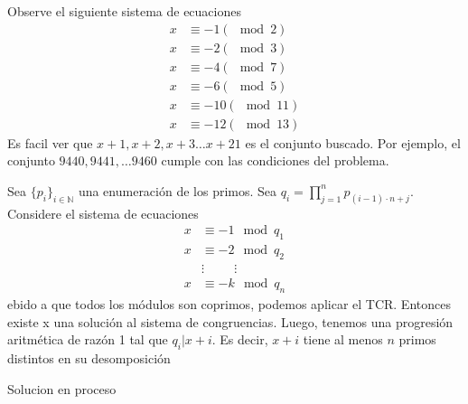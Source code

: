 \begin{sol}
	Observe el siguiente sistema de ecuaciones
	\begin{align}
	x & \equiv -1 (\mod 2) \\
	x & \equiv -2 (\mod 3) \\
	x & \equiv -4 (\mod 7) \\
	x & \equiv -6 (\mod 5) \\
	x & \equiv -10 (\mod 11) \\
	x & \equiv -12 ( \mod 13)
	\end{align}
	Es facil ver que $x+1, x+2, x+3 \dots x+21$ es el conjunto buscado.
	Por ejemplo, el conjunto ${9440, 9441, \dots 9460 }$ cumple con las condiciones del problema.
\end{sol}

\begin{sol}
	Sea $\{p_{i}\}_{i\in \mathbb{N}}$ una enumeraci\'on de los primos. Sea $q_{i} = \prod_{j=1}^{n} p_{(i-1)\cdot n + j }$. Considere el sistema de ecuaciones
	\begin{align}
	x &\equiv -1 \mod q_{1} \\
	x&\equiv -2 \mod q_{2} \\
	&\vdots \hspace{1cm} \vdots \\
	x &\equiv -k \mod q_{n}   
	\end{align}
	ebido a que todos los m\'odulos son coprimos, podemos aplicar el TCR. Entonces existe x una soluci\'on al sistema de congruencias. Luego, tenemos una progresi\'on aritm\'etica de raz\'on 1 tal que $q_{i} |x+i$. Es decir, $x+i$ tiene al menos $n$ primos distintos en su desomposici\'on 
\end{sol}

\begin{sol}
	Solucion en proceso
\end{sol}

